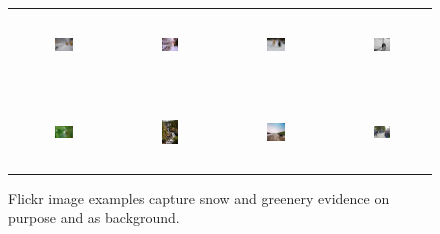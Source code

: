 \documentclass[10pt]{article}
\begin{document}
\begin{figure}[th]
{\small{
\begin{center}
\begin{tabular}{@{}c@{\,\,\,}c@{\,\,\,}c@{\,\,\,}c@{\,\,\,}}
\includegraphics[width=0.19\textwidth, height=0.7in]{image/citysnow.jpg} &
\includegraphics[width=0.19\textwidth, height=0.7in]{image/citysnow2.jpg} &
\includegraphics[width=0.19\textwidth, height=0.7in]{image/dogsnow.jpg} &
\includegraphics[width=0.19\textwidth, height=0.7in]{image/humansnow.jpg} \\
\\[-6pt]
\hline
\\[-6pt]
\includegraphics[width=0.19\textwidth, height=0.7in]{image/intentiongreen.jpg} &
\includegraphics[width=0.19\textwidth, height=0.7in]{image/waterfallgreen.jpg} &
\includegraphics[width=0.19\textwidth, height=0.7in]{image/dogtree.jpg} &
\includegraphics[width=0.19\textwidth, height=0.7in]{image/humantree.jpg} \\
\end{tabular}
\end{center}
}}
\caption{Flickr image examples capture snow and greenery evidence on purpose and as background.}
\label{fig:flickrexp}
\end{figure}
\end{document}
